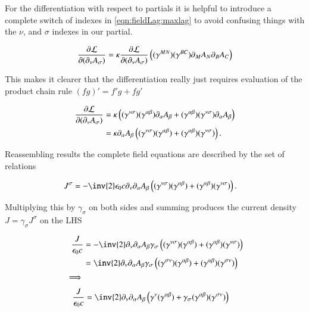 For the differentiation with respect to partials it is helpful to introduce a complete switch of indexes in \ref{eqn:fieldLag:maxlag}
to avoid confusing things with the $\nu$, and $\sigma$ indexes in our partial.

\begin{align*}
\frac{\partial {\mathcal{L}}}{\partial {(\partial_\nu A_\sigma)}} 
&= \kappa \frac{\partial {\mathcal{L}}}{\partial {(\partial_\nu A_\sigma)}} \left( (\gamma^{M N}) (\gamma^{B C}) \partial_M A_N \partial_B A_C \right) \\
\end{align*}

This makes it clearer that the differentiation really just requires evaluation of the product chain rule $(fg)' = f'g + f g'$

\begin{align*}
\frac{\partial {\mathcal{L}}}{\partial {(\partial_\nu A_\sigma)}} 
&=
\kappa
\left(
(\gamma^{\nu\sigma}) (\gamma^{\alpha\beta}) \partial_\alpha A_\beta 
+(\gamma^{\alpha\beta}) (\gamma^{\nu\sigma}) \partial_\alpha A_\beta
\right) \\
&= \kappa \partial_\alpha A_\beta \left( (\gamma^{\nu\sigma}) (\gamma^{\alpha\beta}) +(\gamma^{\alpha\beta}) (\gamma^{\nu\sigma}) \right).
\end{align*}


Reassembling results the complete field equations are described by the set of relations

\begin{align*}
J^\sigma
&= -\inv{2} \epsilon_0 c \partial_\nu \partial_\alpha A_\beta
\left( (\gamma^{\nu\sigma}) (\gamma^{\alpha\beta}) +(\gamma^{\alpha\beta}) (\gamma^{\nu\sigma}) \right).
\end{align*}

Multiplying this by $\gamma_\sigma$ on both sides and summing produces the current density $J = \gamma_\sigma J^\sigma$ on the LHS

\begin{align*}
\frac{J}{\epsilon_0 c}
&= -\inv{2}
\partial_\nu \partial_\alpha A_\beta
\gamma_\sigma
\left( (\gamma^{\nu\sigma}) (\gamma^{\alpha\beta}) +(\gamma^{\alpha\beta}) (\gamma^{\nu\sigma}) \right) \\
&= \inv{2}
\partial_\nu \partial_\alpha A_\beta
\gamma_\sigma
\left( (\gamma^{\sigma\nu}) (\gamma^{\alpha\beta}) +(\gamma^{\alpha\beta}) (\gamma^{\sigma\nu}) \right) \\
\implies \\
\end{align*}
\begin{align}\label{eqn:fieldLag:gettingthere}
\frac{J}{\epsilon_0 c}
&= \inv{2}
\partial_\nu \partial_\alpha A_\beta
\left(
\gamma^{\nu} (\gamma^{\alpha\beta}) +
\gamma_\sigma (\gamma^{\alpha\beta}) (\gamma^{\sigma\nu})
\right)
\end{align}

